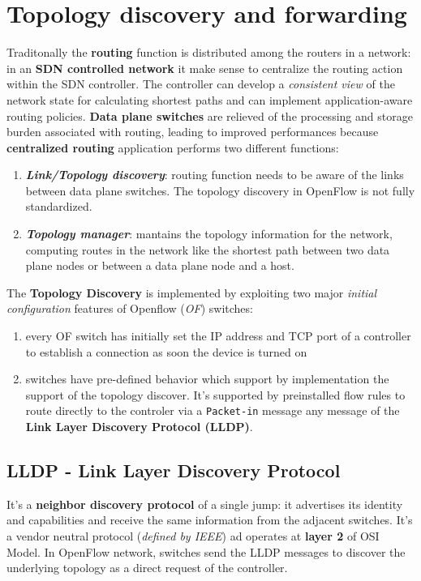 \documentclass[10pt,a4paper]{report}
\theoremstyle{definition}
\begin{document}
\section{Topology discovery and forwarding}
\label{sec:topology-discovery-and-forwarding-in-sdns}

Traditonally the \textbf{routing} function is distributed among the routers in a network: in an \textbf{SDN controlled network} it make sense to centralize the routing action within the SDN controller. The controller can develop a \textit{consistent view} of the network state for calculating shortest paths and can implement application-aware routing policies.
\textbf{Data plane switches} are relieved of the processing and storage burden associated with routing, leading to improved performances because \textbf{centralized routing} application performs two different functions:
\begin{enumerate}
	\item 
	\textit{\textbf{Link/Topology discovery}}: routing function needs to be aware of the links between data plane switches. The topology discovery in OpenFlow is not fully standardized.
	\item 
	\textit{\textbf{Topology manager}}: mantains the topology information for the network, computing routes in the network like the shortest path between two data plane nodes or between a data plane node and a host.
\end{enumerate}
The \textbf{Topology Discovery} is implemented by exploiting two major \textit{initial configuration} features of Openflow (\textit{OF}) switches:
\begin{enumerate}
	\item 
	every OF switch has initially set the IP address and TCP port of a controller to establish a connection as soon the device is turned on
	\item 
	switches have pre-defined behavior which support by implementation the support of the topology discover. It's supported by preinstalled flow rules to route directly to the controler via a \texttt{Packet-in} message any message of the \textbf{Link Layer Discovery Protocol (LLDP)}.
\end{enumerate}
\subsection{LLDP - Link Layer Discovery Protocol}\label{sec:lldp---link-layer-discovery-protocol}
It's a \textbf{neighbor discovery protocol} of a single jump: it advertises its identity and capabilities and receive the same information from the adjacent switches.
It's a vendor neutral protocol (\textit{defined by IEEE}) ad operates at \textbf{layer 2} of OSI Model.
In OpenFlow network, switches send the LLDP messages to discover the underlying topology as a direct request of the controller.
\end{document}
